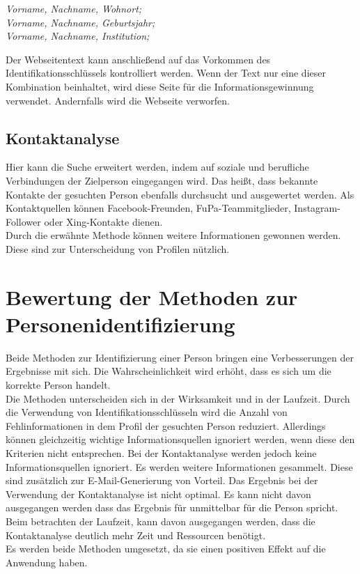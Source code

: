 	\textit{Vorname, Nachname, Wohnort;}\\
	\textit{Vorname, Nachname, Geburtsjahr;}\\
	\textit{Vorname, Nachname, Institution;}
	
	Der Webseitentext kann anschließend auf das Vorkommen des Identifikationsschlüssels kontrolliert werden. Wenn der Text nur eine dieser Kombination beinhaltet, wird diese Seite für die Informationsgewinnung verwendet. Andernfalls wird die Webseite verworfen.\\
	
	\subsection{Kontaktanalyse}	
	Hier kann die Suche erweitert werden, indem auf soziale und berufliche Verbindungen der Zielperson eingegangen wird. Das heißt, dass bekannte Kontakte der gesuchten Person ebenfalls durchsucht und ausgewertet werden. Als Kontaktquellen können Facebook-Freunden, FuPa-Teammitglieder, Instagram-Follower oder Xing-Kontakte dienen.\\
	Durch die erwähnte Methode können weitere Informationen gewonnen werden. Diese sind zur Unterscheidung von Profilen nützlich.
		
\section{Bewertung der Methoden zur Personenidentifizierung}
Beide Methoden zur Identifizierung einer Person bringen eine Verbesserungen der Ergebnisse mit sich. Die Wahrscheinlichkeit wird erhöht, dass es sich um die korrekte Person handelt. \\
Die Methoden unterscheiden sich in der Wirksamkeit und in der Laufzeit. Durch die Verwendung von Identifikationsschlüsseln wird die Anzahl von Fehlinformationen in dem Profil der gesuchten Person reduziert. Allerdings können gleichzeitig wichtige Informationsquellen ignoriert werden, wenn diese den Kriterien nicht entsprechen. Bei der Kontaktanalyse werden jedoch keine Informationsquellen ignoriert. Es werden weitere Informationen gesammelt. Diese sind zusätzlich zur E-Mail-Generierung von Vorteil. Das Ergebnis bei der Verwendung der Kontaktanalyse ist nicht optimal. Es kann nicht davon ausgegangen werden dass das Ergebnis für unmittelbar für die Person spricht. Beim betrachten der Laufzeit, kann davon ausgegangen werden, dass die Kontaktanalyse deutlich mehr Zeit und Ressourcen benötigt.\\
Es werden beide Methoden umgesetzt, da sie einen positiven Effekt auf die Anwendung haben.

